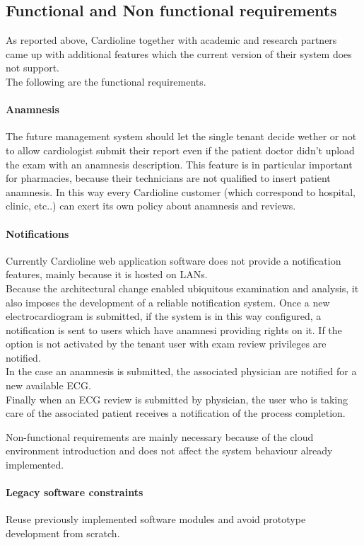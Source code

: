\subsection{Functional and Non functional requirements} As reported above, Cardioline together with academic and research partners came up with additional features which the current version of their system does not support.\\The following are the functional requirements.
\paragraph{Anamnesis}The future management system should let the single tenant decide wether or not to allow cardiologist submit their report even if the patient doctor didn't upload the exam with an anamnesis description. This feature is in particular important for pharmacies, because their technicians are not qualified to insert patient anamnesis. In this way every Cardioline customer (which correspond to hospital, clinic, etc..) can exert its own policy about anamnesis and reviews.
\paragraph{Notifications}Currently Cardioline web application software does not provide a notification features, mainly because it is hosted on LANs.\\Because the architectural change enabled ubiquitous examination and analysis, it also imposes the development of a reliable notification system. Once a new electrocardiogram is submitted, if the system is in this way configured, a notification is sent to users which have anamnesi providing rights on it. If the option is not activated by the tenant user with exam review privileges are notified.\\In the case an anamnesis is submitted, the associated physician are notified for a new available ECG.\\Finally when an ECG review is submitted by physician, the user who is taking care of the associated patient receives a notification of the process completion.

Non-functional requirements are mainly necessary because of the cloud environment introduction and does not affect the system behaviour already implemented.

\paragraph{Legacy software constraints}
Reuse previously implemented software modules and avoid prototype development from scratch.
